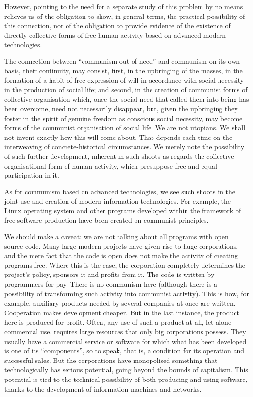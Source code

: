 \documentclass[../main]{subfiles}
\begin{document}
However, pointing to the need for a separate study of this problem by no means relieves us of the obligation to show, in general terms, the practical possibility of this connection, nor of the obligation to provide evidence of the existence of directly collective forms of free human activity based on advanced modern technologies.

The connection between “communism out of need” and communism on its own basis, their continuity, may consist, first, in the upbringing of the masses, in the formation of a habit of free expression of will in accordance with social necessity in the production of social life; and second, in the creation of communist forms of collective organisation which, once the social need that called them into being has been overcome, need not necessarily disappear, but, given the upbringing they foster in the spirit of genuine freedom as conscious social necessity, may become forms of the communist organisation of social life. We are not utopians. We shall not invent exactly how this will come about. That depends each time on the interweaving of concrete-historical circumstances. We merely note the possibility of such further development, inherent in such shoots as regards the collective-organisational form of human activity, which presuppose free and equal participation in it.

As for communism based on advanced technologies, we see such shoots in the joint use and creation of modern information technologies. For example, the Linux operating system and other programs developed within the framework of free software production have been created on communist principles.

We should make a caveat: we are not talking about all programs with open source code. Many large modern projects have given rise to huge corporations, and the mere fact that the code is open does not make the activity of creating programs free. Where this is the case, the corporation completely determines the project’s policy, sponsors it and profits from it. The code is written by programmers for pay. There is no communism here (although there is a possibility of transforming such activity into communist activity). This is how, for example, auxiliary products needed by several companies at once are written. Cooperation makes development cheaper. But in the last instance, the product here is produced for profit. Often, any use of such a product at all, let alone commercial use, requires large resources that only big corporations possess. They usually have a commercial service or software for which what has been developed is one of its “components”, so to speak, that is, a condition for its operation and successful sales. But the corporations have monopolised something that technologically has serious potential, going beyond the bounds of capitalism. This potential is tied to the technical possibility of both producing and using software, thanks to the development of information machines and networks.
\end{document}
